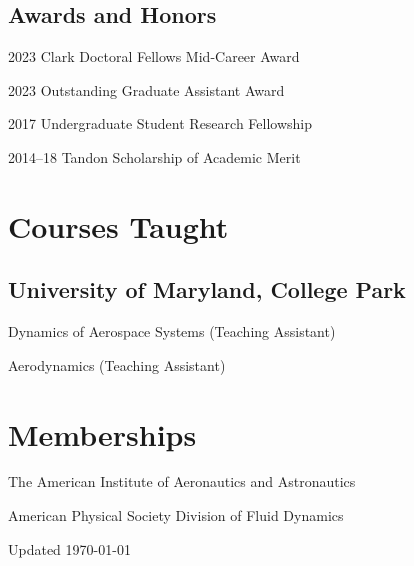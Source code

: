 \documentclass[12pt,letterpaper]{report}
\newcommand{\listitemspace}{0.25em}
\renewenvironment{itemize}
{\begin{list}{}{\setlength{\leftmargin}{0em}
                \setlength{\parskip}{0em}
                \setlength{\itemsep}{\listitemspace}
                \setlength{\parsep}{\listitemspace}}}
{\end{list}}
\begin{document}
    \subsection*{Awards and Honors}

    \begin{tablist}
\item[2023] \tab{}Clark Doctoral Fellows Mid-Career Award 

\item[2023] \tab{}Outstanding Graduate Assistant Award


        \item[2017] \tab{}Undergraduate Student Research Fellowship
        \item[2014--18] \tab{}Tandon Scholarship of Academic Merit

    \end{tablist}





    \section*{Courses Taught}

    \subsection*{University of Maryland, College Park}
    
    \begin{itemize}

        \item Dynamics of Aerospace Systems (Teaching Assistant)
        \item Aerodynamics (Teaching Assistant)

    \end{itemize}

 
    \section*{Memberships}

    \begin{itemize}

        \item The American Institute of Aeronautics and Astronautics
        \item American Physical Society Division of Fluid Dynamics

    \end{itemize}



    \begin{center}
        \vfill
        Updated \monthyeardate\today
    \end{center}
\end{document}
